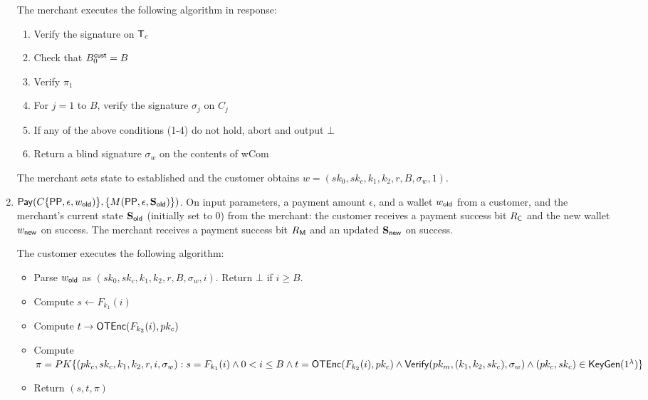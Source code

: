 \documentclass[11pt]{report}
\newcommand{\BC}{B^{\text{\sf cust}}_{\text{0}}}
\begin{document}
\begin{enumerate}
\noindent
The merchant executes the following algorithm in response:
\begin{enumerate}
\item Verify the signature on ${\sf T}_c$
\item Check that $\BC = B$
\item Verify $\pi_1$
\item For $j = 1$ to $B$, verify the signature $\sigma_j$ on $C_j$
\item If any of the above conditions (1-4) do not hold, abort and output $\bot$
\item Return a blind signature $\sigma_w$ on the contents of {\sf wCom}
\end{enumerate}

\noindent
The merchant sets state to {\sf established} and the customer obtains $w = (sk_0, sk_c, k_1, k_2, r, B, \sigma_w, 1)$.

\item ${\sf Pay}( C\{{\sf PP}, \epsilon, w_{\sf old})\}, \{M({\sf PP}, \epsilon, {\bf S}_{\sf old})\})$. On input parameters, a payment amount $\epsilon$, and a wallet $w_{\sf old}$ from a customer, and the merchant's current state ${\bf S}_{\sf old}$ (initially set to $0$) from the merchant: the customer receives a payment success bit $R_{\sf C}$ and the new wallet $w_{\sf new}$ on success. The merchant receives a payment success bit $R_{\sf M}$ and an updated ${\bf S}_{\sf new}$ on success.

\medskip \noindent
The customer executes the following algorithm:
\begin{itemize}
\item Parse $w_{\sf old}$ as $(sk_0, sk_c, k_1, k_2, r, B, \sigma_w, i)$. Return $\bot$ if $i \geq B$.
\item Compute $s \leftarrow F_{k_1}(i)$
\item Compute $t \rightarrow {\sf OTEnc}(F_{k_2}(i), pk_c)$
\item Compute $\pi = PK\{ (pk_c, sk_c, k_1, k_2, r, i, \sigma_w): s = F_{k_1}(i) \wedge 0 < i \leq B\\  \wedge t = {\sf OTEnc}(F_{k_2}(i), pk_c) \\ \wedge {\sf Verify}(pk_m, (k_1, k_2, sk_c), \sigma_w) \\ \wedge (pk_c, sk_c) \in {\sf KeyGen}(1^\lambda) \}$

\item Return $(s, t, \pi)$
\end{itemize}


\end{enumerate}
\end{document}
